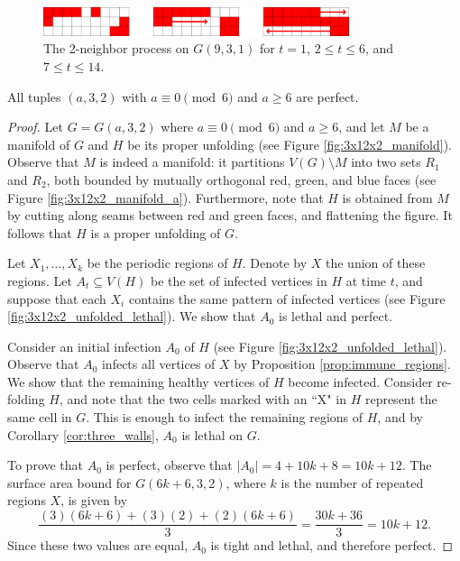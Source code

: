 \begin{figure}[]
\centering
\includegraphics[width=0.8\textwidth]{figures/7/3x9x1.pdf}
\caption{The 2-neighbor process on $G(9,3,1)$ for $t=1$, $2 \le t \le 6$, and $7 \le t \le 14$.}
\label{fig:9x3x1}
\end{figure} 

\begin{con}
\label{con:3x2xa_mod6}
All tuples $(a,3,2)$ with $a \equiv 0 \pmod 6$ and $a \geq 6$ are perfect. 
\end{con}

\begin{proof}
Let $G=G(a,3,2)$ where $a \equiv 0 \pmod 6$ and $a \geq 6$, and let $M$ be a manifold of $G$ and $H$ be its proper unfolding (see Figure \ref{fig:3x12x2_manifold}). Observe that $M$ is indeed a manifold: it partitions $V(G) \setminus M$ into two sets $R_1$ and $R_2$, both bounded by mutually orthogonal red, green, and blue faces (see Figure \ref{fig:3x12x2_manifold_a}). Furthermore, note that $H$ is obtained from $M$ by cutting along seams between red and green faces, and flattening the figure. It follows that $H$ is a proper unfolding of $G$. 

Let $X_1, \dots, X_k$ be the periodic regions of $H$. Denote by $X$ the union of these regions. Let $A_t \subseteq V(H)$ be the set of infected vertices in $H$ at time $t$, and suppose that each $X_i$ contains the same pattern of infected vertices (see Figure \ref{fig:3x12x2_unfolded_lethal}). We show that $A_0$ is lethal and perfect.

Consider an initial infection $A_0$ of $H$ (see Figure \ref{fig:3x12x2_unfolded_lethal}). Observe that $A_0$ infects all vertices of $X$ by Proposition \ref{prop:immune_regions}. We show that the remaining healthy vertices of $H$ become infected. Consider re-folding $H$, and note that the two cells marked with an ``X" in $H$ represent the same cell in $G$. This is enough to infect the remaining regions of $H$, and by Corollary \ref{cor:three_walls}, $A_0$ is lethal on $G$. 

To prove that $A_0$ is perfect, observe that $|A_0| = 4 + 10k + 8 = 10k +12$. The surface area bound for $G(6k+6,3,2)$, where $k$ is the number of repeated regions $X$, is given by
$$\frac{(3)(6k+6) + (3)(2) + (2)(6k+6)}{3} = \frac{30k + 36}{3} = 10k+12.$$
Since these two values are equal, $A_0$ is tight and lethal, and therefore perfect.
\end{proof}

